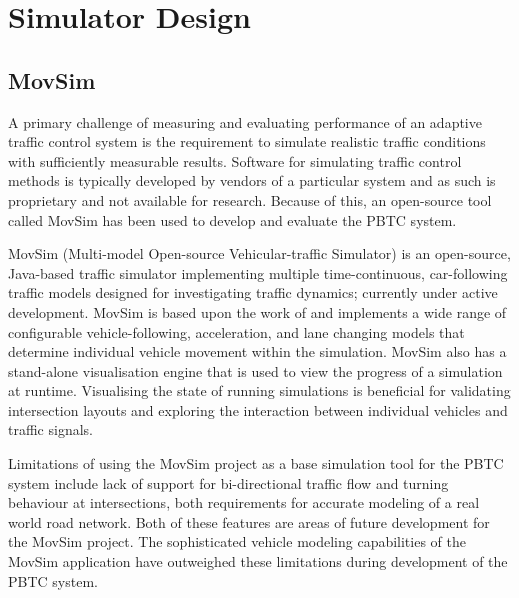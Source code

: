 \section{Simulator Design}

\subsection {MovSim}

A primary challenge of measuring and evaluating performance of an adaptive traffic control system is the requirement to simulate realistic traffic conditions with sufficiently measurable results. Software for simulating traffic control methods is typically developed by vendors of a particular system and as such is proprietary and not available for research. Because of this, an open-source tool called MovSim has been used to develop and evaluate the PBTC system. 

MovSim (Multi-model Open-source Vehicular-traffic Simulator) is an open-source, Java-based traffic simulator implementing multiple time-continuous, car-following traffic models designed for investigating traffic dynamics; currently under active development. MovSim is based upon the work of  and implements a wide range of configurable vehicle-following, acceleration, and lane changing models that determine individual vehicle movement within the simulation. MovSim also has a stand-alone visualisation engine that is used to view the progress of a simulation at runtime. Visualising the state of running simulations is beneficial for validating intersection layouts and exploring the interaction between individual vehicles and traffic signals.

Limitations of using the MovSim project as a base simulation tool for the PBTC system include lack of support for bi-directional traffic flow and turning behaviour at intersections, both requirements for accurate modeling of a real world road network. Both of these features are areas of future development for the MovSim project. The sophisticated vehicle modeling capabilities of the MovSim application have outweighed these limitations during development of the PBTC system.


